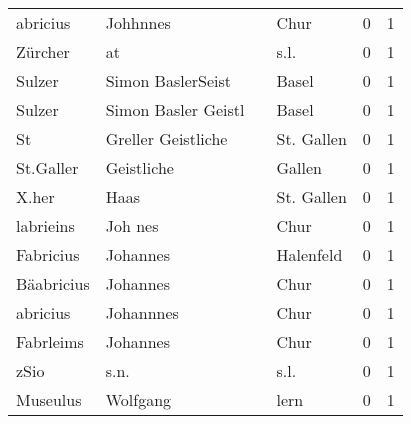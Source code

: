 \begin{center}
\begin{tiny}
\begin{longtabu}{llllrr}
                 abricius &                           Johhnnes &             &                                        Chur &          0 &         1 \\
                  Zürcher &                                 at &             &                                        s.l. &          0 &         1 \\
                   Sulzer &                  Simon BaslerSeist &             &                                       Basel &          0 &         1 \\
                   Sulzer &                Simon Basler Geistl &             &                                       Basel &          0 &         1 \\
                       St &                 Greller Geistliche &             &                                  St. Gallen &          0 &         1 \\
                St.Galler &                         Geistliche &             &                                      Gallen &          0 &         1 \\
                    X.her &                               Haas &             &                                  St. Gallen &          0 &         1 \\
                labrieins &                            Joh nes &             &                                        Chur &          0 &         1 \\
                Fabricius &                           Johannes &             &                                   Halenfeld &          0 &         1 \\
               Bäabricius &                           Johannes &             &                                        Chur &          0 &         1 \\
                 abricius &                          Johannnes &             &                                        Chur &          0 &         1 \\
                Fabrleims &                           Johannes &             &                                        Chur &          0 &         1 \\
                     zSio &                               s.n. &             &                                        s.l. &          0 &         1 \\
                 Museulus &                           Wolfgang &             &                                        lern &          0 &         1 \\

\end{longtabu}
\end{tiny}
\end{center}
